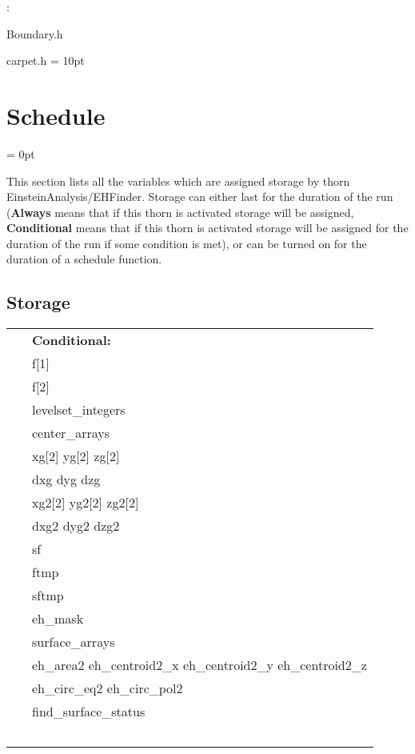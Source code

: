 \vspace{5mm}

: 

Boundary.h

carpet.h
\vspace{2mm}\parskip = 10pt 

\section{Schedule} 


\parskip = 0pt


\noindent This section lists all the variables which are assigned storage by thorn EinsteinAnalysis/EHFinder.  Storage can either last for the duration of the run ({\bf Always} means that if this thorn is activated storage will be assigned, {\bf Conditional} means that if this thorn is activated storage will be assigned for the duration of the run if some condition is met), or can be turned on for the duration of a schedule function.


\subsection*{Storage}

\hspace{5mm}

 \begin{tabular*}{160mm}{ll} 
~& {\bf Conditional:} \\ 
~ &  f[1]\\ 
~ &  f[2]\\ 
~ &  levelset\_integers\\ 
~ &  center\_arrays\\ 
~ &  xg[2] yg[2] zg[2]\\ 
~ &  dxg dyg dzg\\ 
~ &  xg2[2] yg2[2] zg2[2]\\ 
~ &  dxg2 dyg2 dzg2\\ 
~ &  sf\\ 
~ &  ftmp\\ 
~ &  sftmp\\ 
~ &  eh\_mask\\ 
~ &  surface\_arrays\\ 
~ &  eh\_area2 eh\_centroid2\_x eh\_centroid2\_y eh\_centroid2\_z\\ 
~ &  eh\_circ\_eq2 eh\_circ\_pol2\\ 
~ &  find\_surface\_status\\ 
~ & ~\\ 
\end{tabular*} 


